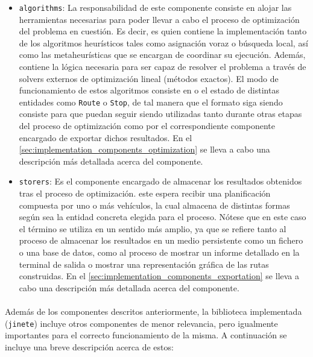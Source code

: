 \documentclass{subfiles}
\begin{document}
\begin{itemize}
              \item \texttt{algorithms}: La responsabilidad de este componente consiste en alojar las herramientas necesarias para poder llevar a cabo el proceso de optimización del problema en cuestión. Es decir, es quien contiene la implementación tanto de los algoritmos heurísticos tales como asignación voraz o búsqueda local, así como las metaheurísticas que se encargan de coordinar su ejecución. Además, contiene la lógica necesaria para ser capaz de resolver el problema a través de solvers externos de optimización lineal (métodos exactos). El modo de funcionamiento de estos algoritmos consiste en  o  el estado de distintas entidades como \texttt{Route} o \texttt{Stop}, de tal manera que el formato siga siendo consiste para que puedan seguir siendo utilizadas tanto durante otras etapas del proceso de optimización como por el correspondiente componente encargado de exportar dichos resultados. En el \cref{sec:implementation_components_optimization} se lleva a cabo una descripción más detallada acerca del componente.
            
              \item \texttt{storers}: Es el componente encargado de almacenar los resultados obtenidos tras el proceso de optimización. este espera recibir una planificación compuesta por uno o más vehículos, la cual almacena de distintas formas según sea la entidad concreta elegida para el proceso. Nótese que en este caso el término  se utiliza en un sentido más amplio, ya que se refiere tanto al proceso de almacenar los resultados en un medio persistente como un fichero o una base de datos, como al proceso de mostrar un informe detallado en la terminal de salida o mostrar una representación gráfica de las rutas construidas. En el \cref{sec:implementation_components_exportation} se lleva a cabo una descripción más detallada acerca del componente.
 
         
          \end{itemize}

          \paragraph{}
          Además de los componentes descritos anteriormente, la biblioteca implementada (\texttt{jinete}) incluye otros componentes de menor relevancia, pero igualmente importantes para el correcto funcionamiento de la misma. A continuación se incluye una breve descripción acerca de estos:
\end{document}
